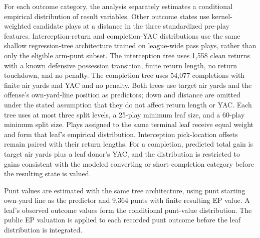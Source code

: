 \documentclass[11pt]{article}
\begin{document}
For each outcome category, the analysis separately estimates a conditional empirical distribution of result variables. Other outcome states use kernel-weighted candidate plays at a distance in the three standardized pre-play features. Interception-return and completion-YAC distributions use the same shallow regression-tree architecture trained on league-wide pass plays, rather than only the eligible arm-punt subset. The interception tree uses 1,558 clean returns with a known defensive possession transition, finite return length, no return touchdown, and no penalty. The completion tree uses 54,077 completions with finite air yards and YAC and no penalty. Both trees use target air yards and the offense's own-yard-line position as predictors; down and distance are omitted under the stated assumption that they do not affect return length or YAC. Each tree uses at most three split levels, a 25-play minimum leaf size, and a 60-play minimum split size. Plays assigned to the same terminal leaf receive equal weight and form that leaf's empirical distribution. Interception pick-location offsets remain paired with their return lengths. For a completion, predicted total gain is target air yards plus a leaf donor's YAC, and the distribution is restricted to gains consistent with the modeled converting or short-completion category before the resulting state is valued.

Punt values are estimated with the same tree architecture, using punt starting own-yard line as the predictor and 9,364 punts with finite resulting EP value. A leaf's observed outcome values form the conditional punt-value distribution. The public EP valuation is applied to each recorded punt outcome before the leaf distribution is integrated.
\end{document}
